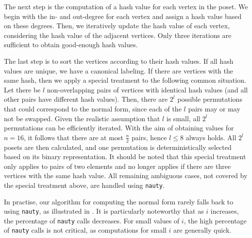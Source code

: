 \documentclass[a4paper,UKenglish,cleveref, autoref, thm-restate]{lipics-v2021}
\begin{document}
%
%  
The next step is the computation of a hash value for each vertex in the poset.
We begin with the in- and out-degree for each vertex and assign a hash value based on these degrees.
Then, we iteratively update the hash value of each vertex, considering the hash value of the adjacent vertices.
Only three iterations are sufficient to obtain good-enough hash values.

The last step is to sort the vertices according to their hash values.
If all hash values are unique, we have a canonical labeling.
If there are vertices with the same hash, then we apply a special treatment to the following common situation.
Let there be $l$ non-overlapping pairs of vertices with identical hash values (and all other pairs have different hash values).
Then, there are $2^l$ possible permutations that could correspond to the normal form, since each of the $l$ pairs may or may not be swapped.
Given the realistic assumption that $l$ is small, all $2^l$ permutations can be efficiently iterated.
With the aim of obtaining values for $n = 16$, it follows that there are at most $\frac{n}{2}$ pairs, hence $l \leq 8$ always holds.
All $2^l$ posets are then calculated, and one permutation is deterministically selected based on its binary representation.
It should be noted that this special treatment only applies to pairs of two elements and no longer applies if there are three vertices with the same hash value.
All remaining ambiguous cases, not covered by the special treatment above, are handled using \texttt{nauty}.

In practise, our algorithm for computing the normal form rarely falls back to using \texttt{nauty}, as illustrated in .
It is particularly noteworthy that as $i$ increases, the percentage of \texttt{nauty} calls decreases.
For small values of $i$, the high percentage of \texttt{nauty} calls is not critical, as computations for small $i$ are generally quick.
\end{document}
